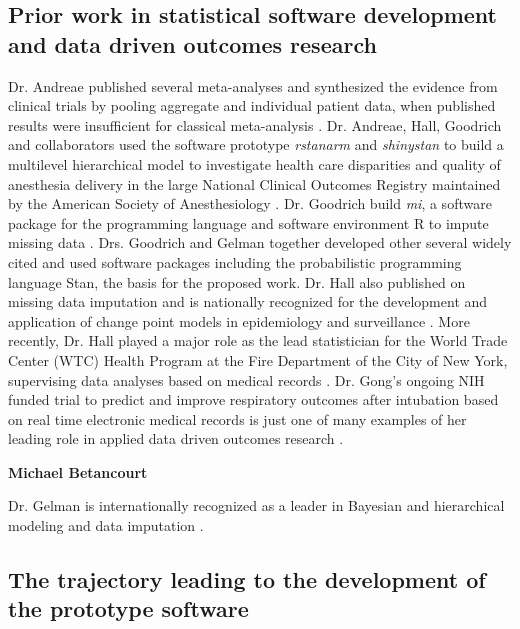 \documentclass[11pt,notitlepage]{article}
\begin{document}
\subsection*{Prior work in statistical software development and data driven outcomes research} Dr. Andreae published several meta-analyses and synthesized the evidence from clinical trials by pooling aggregate and individual patient data, when published results were insufficient for classical meta-analysis \cite{AndreaeJohnsonAbstract2013, Andreae2013, Andreae2015, Carter2015, Atchabahian2015}. Dr. Andreae, Hall, Goodrich and collaborators used the software prototype \textit{rstanarm} and \textit{shinystan} to build a multilevel hierarchical model to investigate health care disparities and quality of anesthesia delivery in the large National Clinical Outcomes Registry maintained by the American Society of Anesthesiology \cite{AndreaeWhite2015}. Dr. Goodrich build \textit{mi}, a software package for the programming language and software environment R to impute missing data \cite{miCRAN}. Drs. Goodrich and Gelman together developed other several widely cited and used software packages including the probabilistic programming language Stan\cite{SDT2014}, the basis for the proposed work. Dr. Hall also published on missing data imputation \cite{Hall2009a, Wang_20029935, Wang_20029935} and is nationally recognized for the development and application of change point models in epidemiology and surveillance \cite{Hall2000, Hall2001, Hall2003bayesian, Hall2009, Hall2015}. More recently, Dr. Hall played a major role as the lead statistician for the World Trade Center (WTC) Health Program at the Fire Department of the City of New York, supervising data analyses based on medical records \cite{Aldrich2010, Hall2015, Zeig-Owens2011}.  
Dr. Gong's ongoing NIH funded trial to predict and improve respiratory outcomes after intubation based on real time electronic medical records is just one of many examples of her leading role in applied data driven outcomes research \cite{Gong2005, Gong2010, Gajic2011, Yu_24970344, Kor2014}. 

\textbf{Michael Betancourt}

Dr. Gelman is internationally recognized as a leader in Bayesian and hierarchical modeling and data imputation \cite{Gelman1998notasked, Gelman2001imputation, Hoffman2014, Gelman-Hill_2014}.

\subsection*{The trajectory leading to the development of the prototype software} 
\end{document}

